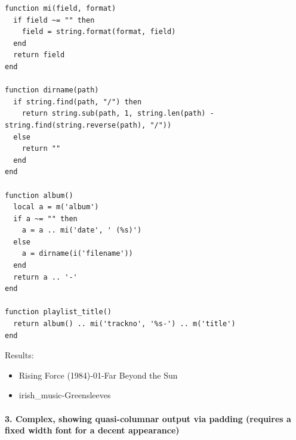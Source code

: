 \documentclass[10pt,english]{article}
\begin{document}
\begin{verbatim}
function mi(field, format)
  if field ~= "" then
    field = string.format(format, field)
  end
  return field
end

function dirname(path)
  if string.find(path, "/") then
    return string.sub(path, 1, string.len(path) - string.find(string.reverse(path), "/"))
  else
    return ""
  end
end

function album()
  local a = m('album')
  if a ~= "" then
    a = a .. mi('date', ' (%s)')
  else
    a = dirname(i('filename'))
  end
  return a .. '-'
end

function playlist_title()
  return album() .. mi('trackno', '%s-') .. m('title')
end
\end{verbatim}



\noindent Results:


\begin{itemize}
\item Rising Force (1984)-01-Far Beyond the Sun
\item irish\_music-Greensleeves
\end{itemize}



\paragraph*{3. Complex, showing quasi-columnar output via padding (requires a fixed width font for a decent appearance)}
\end{document}
